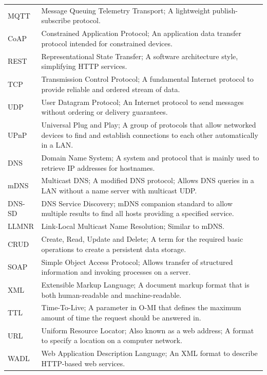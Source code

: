 \begin{longtable}{@{}p{}p{}@{}}
MQTT & Message Queuing Telemetry Transport; A lightweight publish-subscribe protocol. \\
CoAP & Constrained Application Protocol; An application data transfer protocol intended for constrained devices.\\
REST & Representational State Transfer; A software architecture style, simplifying HTTP services. \\
TCP & Transmission Control Protocol; A fundamental Internet protocol to provide reliable and ordered stream of data. \\
UDP & User Datagram Protocol; An Internet protocol to send messages without ordering or delivery guarantees. \\
UPnP & Universal Plug and Play; A group of protocols that allow networked devices to find and establish connections to each other automatically in a LAN. \\
DNS & Domain Name System; A system and protocol that is mainly used to retrieve IP addresses for hostnames. \\
mDNS & Multicast DNS; A modified DNS protocol; Allows DNS queries in a LAN without a name server with multicast UDP. \\
DNS-SD & DNS Service Discovery; mDNS companion standard to allow multiple results to find all hosts providing a specified service. \\
LLMNR & Link-Local Multicast Name Resolution; Similar to mDNS. \\
CRUD & Create, Read, Update and Delete; A term for the required basic operations to create a persistent data storage. \\
SOAP & Simple Object Access Protocol; Allows transfer of structured information and invoking processes on a server. \\
XML & Extensible Markup Language; A document markup format that is both human-readable and machine-readable. \\
TTL & Time-To-Live; A parameter in O-MI that defines the maximum amount of time the request should be answered in. \\
URL & Uniform Resource Locator; Also known as a web address; A format to specify a location on a computer network. \\
WADL & Web Application Description Language; An XML format to describe HTTP-based web services. \\

\end{longtable}
